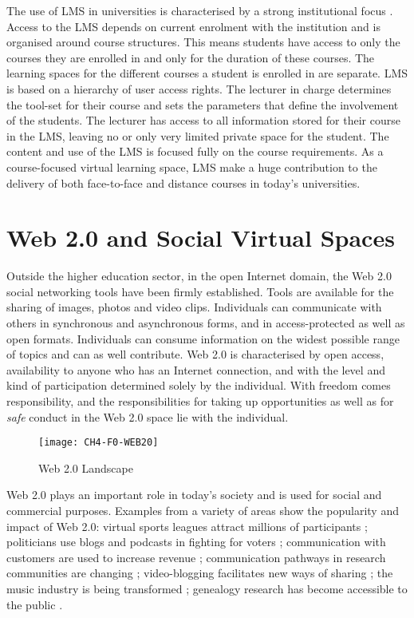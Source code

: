 The use of LMS in universities is characterised by a strong institutional focus
\citep{Siemens2004}. Access to the LMS depends on current enrolment with the
institution and is organised around course structures. This means students have
access to only the courses they are enrolled in and only for the duration of
these courses. The learning spaces for the different courses a student is
enrolled in are separate. LMS is based on a hierarchy of user access rights. The
lecturer in charge determines the tool-set for their course and sets the
parameters that define the involvement of the students. The lecturer has access
to all information stored for their course in the LMS, leaving no or only very
limited private space for the student. The content and use of the LMS is focused
fully on the course requirements. As a course-focused virtual learning space,
LMS make a huge contribution to the delivery of both face-to-face and distance
courses in today's universities.

\section{Web 2.0 and Social Virtual Spaces}
Outside the higher education sector, in the open Internet domain, the Web 2.0
social networking tools have been firmly established. Tools are available for
the sharing of images, photos and video clips. Individuals can communicate with
others in synchronous and asynchronous forms, and in access-protected as well as
open formats. Individuals can consume information on the widest possible range
of topics and can as well contribute. Web 2.0 is characterised by open access,
availability to anyone who has an Internet connection, and with the level and
kind of participation determined solely by the individual. With freedom comes
responsibility, and the responsibilities for taking up opportunities as well as
for \textit{safe} conduct in the Web 2.0 space lie with the individual.

\begin{figure}[htb]
\centering
\texttt{[image: CH4-F0-WEB20]}
\caption[Web 2.0 Landscape]{Web 2.0 Landscape \citep{Dawson2007}}
\label{fig:web20l}
\end{figure}

Web 2.0 plays an important role in today's society and is used for social and
commercial purposes. Examples from a variety of areas show the popularity and
impact of Web 2.0: virtual sports leagues attract millions of participants
\citep{Holahan2006}; politicians use blogs and podcasts in fighting for
voters \citep{Capell2006}; communication with customers are used to increase
revenue \citep{Havenstein2007}; communication pathways in research communities
are changing \citep{Ashling2007}; video-blogging facilitates new ways of sharing
\citep{LibraryTechnologyReports2007}; the music industry is being transformed
\citep{Holahan2007}; genealogy research has become accessible to the public
\citep{MacMillan2007}.

